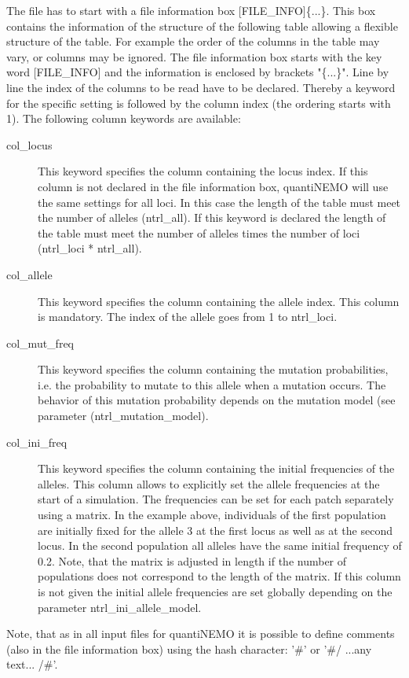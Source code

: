 \documentclass[letterpaper,12pt,oneside]{book}
\begin{document}
\begin{description}
The file has to start with a file information box \textsf{[FILE\_INFO]}\{...\}. This box contains the information of the structure of the following table allowing a flexible structure of the table. For example the order of the columns in the table may vary, or columns may be ignored. The file information box starts with the key word \textsf{[FILE\_INFO]} and the information is enclosed by brackets "\{...\}". Line by line the index of the columns to be read have to be declared. Thereby a keyword for the specific setting is followed by the column index (the ordering starts with 1). The following column keywords are available:
\begin{description}
\item [col\_locus] This keyword specifies the column containing the locus index. If this column is not declared in the file information box, quantiNEMO will use the same settings for all loci. In this case the length of the table must meet the number of alleles (\textsf{ntrl\_all}). If this keyword is declared the length of the table must meet the number of alleles times the number of loci (\textsf{ntrl\_loci} * \textsf{ntrl\_all}).   
\item [col\_allele] This keyword specifies the column containing the allele index. This column is mandatory. The index of the allele goes from 1 to \textsf{ntrl\_loci}.
\item [col\_mut\_freq] This keyword specifies the column containing the mutation probabilities, i.e. the probability to mutate to this allele when a mutation occurs. The behavior of this mutation probability depends on the mutation model (see parameter (\textsf{ntrl\_mutation\_model}).
\item [col\_ini\_freq] This keyword specifies the column containing the initial frequencies of the alleles. This column allows to explicitly set the allele frequencies at the start of a simulation. The frequencies can be set for each patch separately using a matrix. In the example above, individuals of the first population are initially fixed for the allele 3 at the first locus as well as at the second locus. In the second population all alleles have the same initial frequency of 0.2. Note, that the matrix is adjusted in length if the number of populations does not correspond to the length of the matrix. If this column is not given the initial allele frequencies are set globally depending on the parameter \textsf{ntrl\_ini\_allele\_model}.
\end{description} 
Note, that as in all input files for quantiNEMO it is possible to define comments (also in the file information box) using the hash character: '\#' or '\#/ ...any text... /\#'.
\end{description}
\end{document}
